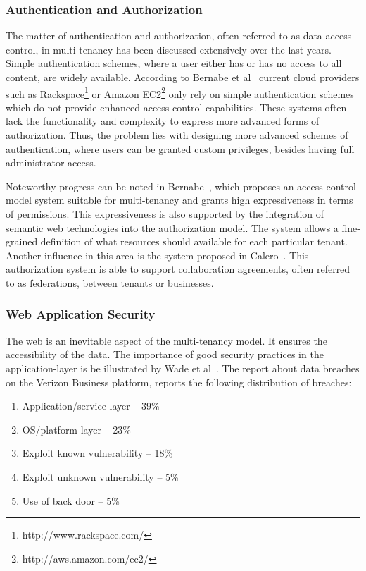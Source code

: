\subsubsection{Authentication and Authorization}
The matter of authentication and authorization, often referred to as data access control, in multi-tenancy has been discussed extensively over the last years. 
Simple authentication schemes, where a user either has or has no access to all content, are widely available. According to Bernabe et al~\cite{Bernabe2012Auth} current cloud providers such as Rackspace\footnote{http://www.rackspace.com/} or Amazon EC2\footnote{http://aws.amazon.com/ec2/} only rely on simple authentication schemes which do not provide enhanced access control capabilities. 
These systems often lack the functionality and complexity to express more advanced forms of authorization. 
Thus, the problem lies with designing more advanced schemes of authentication, where users can be granted custom privileges, besides having full administrator access.

Noteworthy progress can be noted in Bernabe~\cite{Bernabe2012Auth}, which proposes an access control model system suitable for multi-tenancy and grants high expressiveness in terms of permissions. 
This expressiveness is also supported by the integration of semantic web technologies into the authorization model. 
The system allows a fine-grained definition of what resources should available for each particular tenant. 
Another influence in this area is the system proposed in Calero~\cite{Calero2010Auth}. 
This authorization system is able to support collaboration agreements, often referred to as federations, between tenants or businesses.

\subsubsection{Web Application Security}
The web is an inevitable aspect of the multi-tenancy model. 
It ensures the accessibility of the data. 
The importance of good security practices in the application-layer is be illustrated by Wade et al~\cite{Wade2008Security}.
The report about data breaches on the Verizon Business platform, reports the following distribution of breaches:

\begin{enumerate}
    \item Application/service layer – 39\%
    \item OS/platform layer – 23\%
    \item Exploit known vulnerability – 18\%
    \item Exploit unknown vulnerability – 5\%
    \item Use of back door – 5\%
\end{enumerate}

